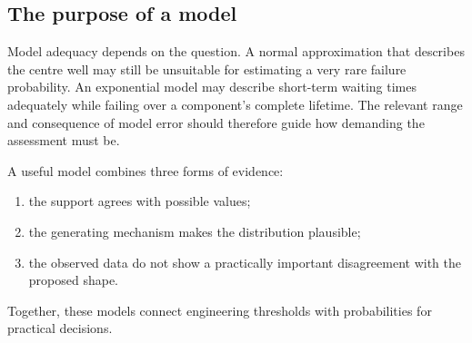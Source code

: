 \subsection{The purpose of a model}

Model adequacy depends on the question. A normal approximation that describes the centre well may still be unsuitable for estimating a very rare failure probability. An exponential model may describe short-term waiting times adequately while failing over a component's complete lifetime. The relevant range and consequence of model error should therefore guide how demanding the assessment must be.

A useful model combines three forms of evidence:
\begin{enumerate}
    \item the support agrees with possible values;
    \item the generating mechanism makes the distribution plausible;
    \item the observed data do not show a practically important disagreement with the proposed shape.
\end{enumerate}

Together, these models connect engineering thresholds with probabilities for practical decisions.
